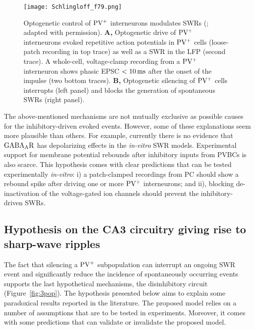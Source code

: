     \begin{figure}
      \center
      \texttt{[image: Schlingloff\_f79.png]}
      \caption{
        Optogenetic control of $\rm PV^+$ interneurons modulates SWRs
        (\citealp{Schlingloff2014}; adapted with permission).
        {\bf A,} Optogenetic drive of $\rm PV^+$ interneurons evoked repetitive action
        potentials in $\rm PV^+$ cells (loose-patch recording in top trace) as well as a
        SWR in the LFP (second trace). A whole-cell, voltage-clamp recording 
        from a $\rm PV^+$ interneuron shows phasic EPSC $<10 \, \rm ms$
        after the onset of the impulse (two bottom traces).
        \textbf{B,} Optogenetic silencing of $\rm PV^+$ cells interrupts (left
        panel) and blocks the generation of spontaneous SWRs (right panel).
             }
    \label{fig:Schlingloff79}
    \end{figure}

    The above-mentioned mechanisms are not mutually exclusive as possible
    causes for the inhibitory-driven evoked events. However, some of these
    explanations seem more plausible than others. For example, currently there
    is no evidence that $\rm GABA_AR$ has depolarizing effects in the
    \textit{in-vitro} SWR models. Experimental support for membrane potential
    rebounds after inhibitory inputs from PVBCs is also scarce. This hypothesis
    comes with clear predictions that can be tested experimentally
    \textit{in-vitro}: i) a patch-clamped recordings from PC should show a
    rebound spike after driving one or more $\rm PV^+$ interneurons; and ii),
    blocking de-inactivation of the voltage-gated ion channels should prevent
    the inhibitory-driven SWRs. 
    
  \subsection{Hypothesis on the CA3 circuitry giving rise to sharp-wave ripples}
  \label{sec:3pop}

    The fact that silencing a $\rm PV^+$ subpopulation can interrupt an ongoing
    SWR event and significantly reduce the incidence of spontaneously occurring
    events \citep{Schlingloff2014} supports the last hypothetical mechanisms,
    the disinhibitory circuit (Figure~\ref{fig:3pop}). The hypothesis presented
    below aims to explain some paradoxical results reported in the literature.
    The proposed model relies on a number of assumptions that are to be tested
    in experiments. Moreover, it comes with some predictions that can validate
    or invalidate the proposed model.

